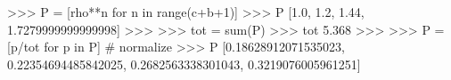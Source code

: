
>>> P = [rho**n for n in range(c+b+1)]
>>> P
[1.0, 1.2, 1.44, 1.7279999999999998]
>>>
>>> tot = sum(P)
>>> tot
5.368
>>>
>>> P = [p/tot for p in P] # normalize
>>> P
[0.18628912071535023, 0.22354694485842025, 0.2682563338301043,
0.3219076005961251]

